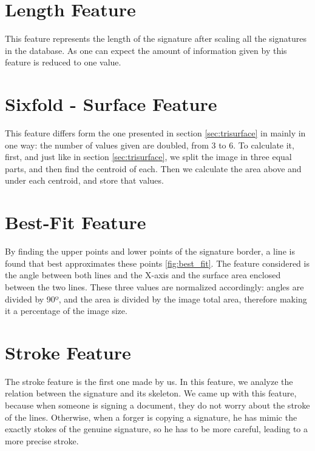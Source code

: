 \documentclass[12pt,a4paper]{report}
\begin{document}
		\section{Length Feature}
		
		This feature represents the length of the signature after scaling all the signatures in the database. As one can expect the amount of information given by this feature is reduced to one value.
				
		\section{Sixfold - Surface Feature}
		This feature differs form the one presented in section \ref{sec:trisurface} in mainly in one way: the number of values given are doubled, from 3 to 6. To calculate it, first, and just like in section \ref{sec:trisurface}, we split the image in three equal parts, and then find the centroid of each. Then we calculate the area above and under each centroid, and store that values.
		
		
		\section{Best-Fit Feature}
		
		By finding the upper points and lower points of the signature border, a line is found that best approximates these points \ref{fig:best_fit}. The feature considered is the angle between both lines and the X-axis and the surface area enclosed between the two lines. These three values are normalized accordingly: angles are divided by 90º, and the area is divided by the image total area, therefore making it a percentage of the image size.
		
		
		\section{Stroke Feature}
		
		The stroke feature is the first one made by us. In this feature, we analyze the relation between the signature and its skeleton. We came up with this feature, because when someone is signing a document, they do not worry about the stroke of the lines. Otherwise, when a forger is copying a signature, he has mimic the exactly stokes of the genuine signature, so he has to be more careful, leading to a more precise stroke.
		
\end{document}
